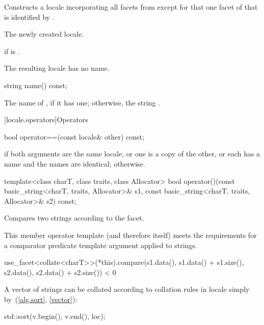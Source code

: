 \begin{itemdescr}
\pnum
\effects
Constructs a locale incorporating
all facets from
except for that one facet of
that is identified by
.

\pnum
\returns
The newly created locale.

\pnum
\throws
{}
if
is .

\pnum
\remarks
The resulting locale has no name.
\end{itemdescr}

%
\begin{itemdecl}
string name() const;
\end{itemdecl}

\begin{itemdescr}
\pnum
\returns
The name of
,
if it has one; otherwise, the string .
\end{itemdescr}

[locale.operators]{Operators}

%
\begin{itemdecl}
bool operator==(const locale& other) const;
\end{itemdecl}

\begin{itemdescr}
\pnum
\returns
{}
if both arguments are the same locale, or one is a copy of the
other, or each has a name and the names are identical;
otherwise.
\end{itemdescr}

%
\begin{itemdecl}
template<class charT, class traits, class Allocator>
  bool operator()(const basic_string<charT, traits, Allocator>& s1,
                  const basic_string<charT, traits, Allocator>& s2) const;
\end{itemdecl}

\begin{itemdescr}
\pnum
\effects
Compares two strings according to the
facet.

\pnum
\remarks
This member operator template (and therefore
itself) meets the requirements for a comparator predicate template argument
applied to strings.

\pnum
\returns
\begin{codeblock}
use_facet<collate<charT>>(*this).compare(s1.data(), s1.data() + s1.size(),
                                         s2.data(), s2.data() + s2.size()) < 0
\end{codeblock}

\pnum
\begin{example}
A vector of strings
can be collated according to collation rules in locale
simply by~(\ref{alg.sort}, \ref{vector}):

\begin{codeblock}
std::sort(v.begin(), v.end(), loc);
\end{codeblock}
\end{example}
\end{itemdescr}


